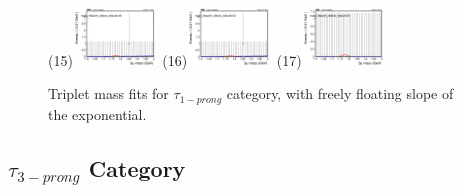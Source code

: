 \begin{figure}[h!]
        \subfigure(15){\includegraphics[width=0.2\textwidth]{power_law/plots/tauhA/massfit_tauhA_40bins_bdtcut0.46.png}}
        \subfigure(16){\includegraphics[width=0.2\textwidth]{power_law/plots/tauhA/massfit_tauhA_40bins_bdtcut0.52.png}}
        \subfigure(17){\includegraphics[width=0.2\textwidth]{power_law/plots/tauhA/massfit_tauhA_40bins_bdtcut0.58.png}}
        \caption{Triplet mass fits for $\tau_{1-prong}$ category, with freely floating slope of the exponential.}
        \label{fig:unfixed_tauha}
\end{figure}

\newpage

\subsection{$\tau_{3-prong}$ Category}
\label{sec:tauhb}

